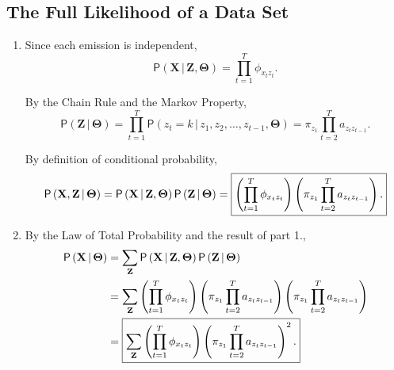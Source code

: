 \documentclass[11pt]{article}
\newcommand{\bX}{\mathbf{X}}
\newcommand{\bZ}{\mathbf{Z}}
\newcommand{\bTheta}{\boldsymbol{\Theta}}
\newcommand{\pr}[1]{\mathsf{P}\left( #1 \right)} %
\newcommand{\giv}{\, | \,} %
\begin{document}
\subsection{The Full Likelihood of a Data Set}
\begin{enumerate}[1.]
\item Since each emission is independent,
\[
   \pr{\bX \giv \bZ, \bTheta}
 = \prod_{t = 1}^T \phi_{x_tz_t}.
\]

By the Chain Rule and the Markov Property,
\[
   \pr{\bZ \giv \bTheta}
 = \prod_{t = 1}^T \pr{z_t = k \giv z_1,z_2,\ldots,z_{t - 1}, \bTheta}
 = \pi_{z_1} \prod_{t = 2}^T a_{z_tz_{t - 1}}.
\]

By definition of conditional probability,
\[
   \pr{\bX, \bZ \giv \bTheta}
 = \pr{\bX \giv \bZ, \bTheta} \pr{\bZ \giv \bTheta}
 = \mbox{\fbox{$\displaystyle \left( \prod_{t = 1}^T \phi_{x_tz_t} \right)
   \left( \pi_{z_1} \prod_{t = 2}^T a_{z_tz_{t - 1}} \right).$}}
\]

\item By the Law of Total Probability and the result of part 1.,
\begin{align*}
     \pr{\bX \giv \bTheta}
 & = \sum_{\bZ} \pr{\bX \giv \bZ, \bTheta} \pr{\bZ \giv \bTheta} \\
 & = \sum_{\bZ} \left( \prod_{t = 1}^T \phi_{x_tz_t} \right)
     \left( \pi_{z_1} \prod_{t = 2}^T a_{z_tz_{t - 1}} \right)
     \left( \pi_{z_1} \prod_{t = 2}^T a_{z_tz_{t - 1}} \right)   \\
 & = \mbox{\fbox{$ \displaystyle
           \sum_{\bZ} \left( \prod_{t = 1}^T \phi_{x_tz_t} \right)
   \left( \pi_{z_1} \prod_{t = 2}^T a_{z_tz_{t - 1}} \right)^2.$}}
\end{align*}
\end{enumerate}
\end{document}
